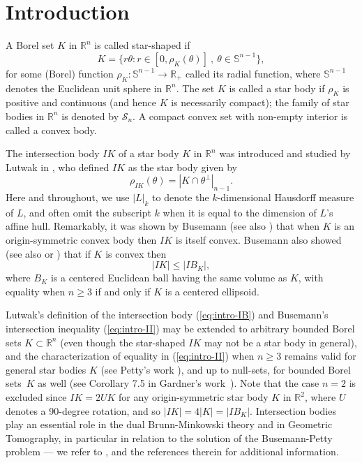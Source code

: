 \documentclass[11pt]{article}
\theoremstyle{definition}
\theoremstyle{proof}
\DeclareMathOperator{\+}{\mathop{\tilde{+}}}
\newcommand{\abs}[1]{\left\vert#1\right\vert}
\newcommand{\R}{\mathbb{R}}
\renewcommand{\S}{\mathbb{S}}
\renewcommand{\SS}{\mathcal{S}}
\numberwithin{equation}{section}
\numberwithin{equation}{section}
\begin{document}
\section{Introduction}

A Borel set $K$ in $\R^n$ is called star-shaped if
\[
K = \{ r \theta : r \in [0,\rho_K(\theta)] ~,~ \theta \in \S^{n-1} \} ,
\]
for some (Borel) function $\rho_K : \S^{n-1} \rightarrow \R_+$ called its radial function, where $\S^{n-1}$ denotes the Euclidean unit sphere in $\R^n$. The set $K$ is called a star body if $\rho_K$ is positive and continuous (and hence $K$ is necessarily compact); the family of star bodies in $\R^n$ is denoted by $\SS_n$. A compact convex set with non-empty interior is called a convex body.

The intersection body $I K$ of a star body $K$ in $\R^n$ was introduced and studied by Lutwak in \cite{Lutwak-intersection-bodies}, who defined $I K$ as the star body given by
\begin{equation} \label{eq:intro-IB}
\rho_{IK}(\theta) = |K \cap \theta^{\perp}|_{n-1} .
\end{equation}
Here and throughout, we use $\abs{L}_k$ to denote the $k$-dimensional Hausdorff measure of $L$, and often omit the subscript $k$ when it is equal to the dimension of $L$'s affine hull. Remarkably, it was shown by Busemann \cite{Busemann-IntersectionBodyIsConvex} (see also \cite[Theorem 8.1.10]{GardnerGeometricTomography2ndEd}) that when $K$ is an origin-symmetric convex body then $I K$ is itself convex. 
Busemann also showed \cite{Busemann-IntersectionBodyInq} (see also \cite[Corollary 9.4.5]{GardnerGeometricTomography2ndEd} or \cite[Section 10.10]{Schneider-Book-2ndEd}) that if $K$ is convex then
\begin{equation} \label{eq:intro-II}
\abs{IK} \leq \abs{I B_K} , \end{equation}
where $B_K$ is a centered Euclidean ball having the same volume as $K$, with equality when $n \geq 3$ if and only if $K$ is a centered ellipsoid. 

Lutwak's definition of the intersection body (\ref{eq:intro-IB}) and Busemann's intersection inequality (\ref{eq:intro-II}) may be extended to arbitrary bounded Borel sets $K \subset \R^n$ (even though the star-shaped $IK$ may not be a star body in general), and the characterization of equality in (\ref{eq:intro-II}) when $n \geq 3$ remains valid for general star bodies $K$ (see Petty's work \cite{Petty-CentroidSurfaces}), and up to null-sets, for bounded Borel sets~$K$ as well (see Corollary 7.5 in Gardner's work~\cite{Gardner-DualAffineQuermassintegrals}).
 Note that the case $n=2$ is excluded since $I K = 2 U K$ for any origin-symmetric star body $K$ in $\R^2$, where $U$ denotes a 90-degree rotation, and so $\abs{I K} = 4 \abs{K} = \abs{I B_K}$. Intersection bodies play an essential role in the dual Brunn-Minkowski theory and in Geometric Tomography, in particular in relation to the solution of the Busemann-Petty problem --- we refer to \cite{Gardner-BP-3dim, GKS, Koldobsky-Book, Lutwak-intersection-bodies,Zhang-Correction-4dim}, \cite[Chapter 8]{GardnerGeometricTomography2ndEd} and the references therein for additional information. 
\end{document}
